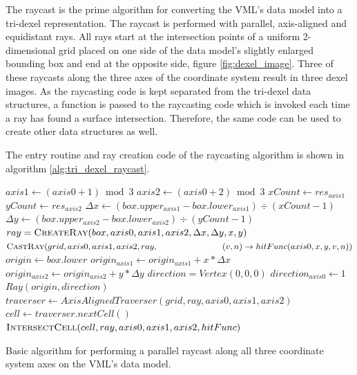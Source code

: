 The raycast is the prime algorithm for converting the VML's data model into a tri-dexel representation.
The raycast is performed with parallel, axis-aligned and equidistant rays.
All rays start at the intersection points of a uniform 2-dimensional grid placed on one side of the data model's slightly enlarged bounding box and end at the opposite side, \cf figure \ref{fig:dexel_image}.
Three of these raycasts along the three axes of the coordinate system result in three dexel images.
As the raycasting code is kept separated from the tri-dexel data structures, a function is passed to the raycasting code which is invoked each time a ray has found a surface intersection.
Therefore, the same code can be used to create other data structures as well. %

The entry routine and ray creation code of the raycasting algorithm is shown in algorithm \ref{alg:tri_dexel_raycast}.
%
\begin{algorithm}
	\centering
	\begin{algorithmic}[1]
				\State $axis1 \gets (axis0 + 1) \bmod 3$
				\State $axis2 \gets (axis0 + 2) \bmod 3$
				\State $xCount \gets res_{axis1}$
				\State $yCount \gets res_{axis2}$
				\State $\Delta x \gets (box.upper_{axis1} - box.lower_{axis1}) \div (xCount - 1)$
				\State $\Delta y \gets (box.upper_{axis2} - box.lower_{axis2}) \div (yCount - 1)$
						\State $ray = \Call{CreateRay}{box, axis0, axis1, axis2, \Delta x, \Delta y, x, y}$
						\State $\Call{CastRay}{grid, axis0, axis1, axis2, ray,\hfill\break
							\hspace*{\dimexpr\algorithmicindent*5}(v, n) \rightarrow hitFunc(axis0, x, y, v, n)}$
					\EndFor
				\EndFor
			\EndFor
		\EndProcedure
		\\
			\State $origin \gets box.lower$
			\State $origin_{axis1} \gets origin_{axis1} + x * \Delta x$
			\State $origin_{axis2} \gets origin_{axis2} + y * \Delta y$
			\State $direction = Vertex(0, 0, 0)$
			\State $direction_{axis0} \gets 1$
			\State \Return $Ray(origin, direction)$
		\EndFunction
		\\
			\State $traverser \gets AxisAlignedTraverser(grid, ray, axis0, axis1, axis2)$
				\State $cell \gets traverser.nextCell()$
				\State $\Call{IntersectCell}{cell, ray, axis0, axis1, axis2, hitFunc}$
			\EndWhile
		\EndProcedure
	\end{algorithmic}
	\caption{
		Basic algorithm for performing a parallel raycast along all three coordinate system axes on the VML's data model.
	}
	\label{alg:tri_dexel_raycast}
\end{algorithm}
